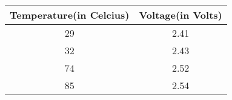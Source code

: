 
\begin{center}
\begin{tabular}{|c|c|}
\hline
	\textbf{Temperature(in Celcius)}& \textbf{Voltage(in Volts)}\\ \hline
	29	&2.41	\\ \hline
	32	&2.43	\\ \hline
	74	&2.52   \\ \hline
	85	&2.54   \\ \hline
\end{tabular}
\end{center}
